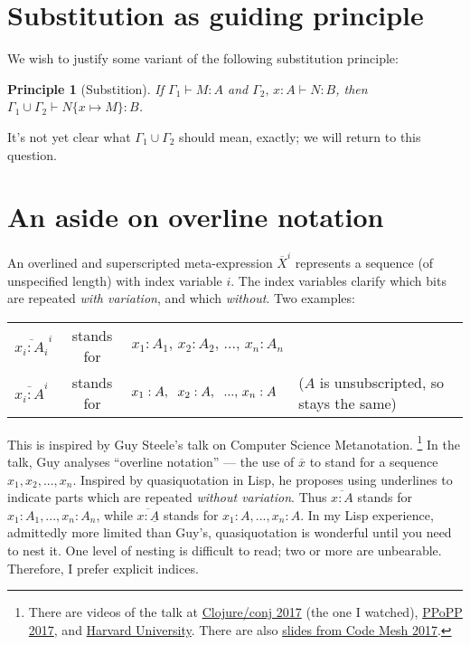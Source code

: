 \documentclass{article}
\newtheorem{principle}{Principle}
\newcommand{\todo}[1]{{\color{red}#1}}
\newcommand{\GG}{\Gamma}
\newcommand{\sub}[1]{\{{#1}\}}
\newcommand{\h}[3]{#1 : {#2}}
\begin{document}

\section{Substitution as guiding principle}

We wish to justify some variant of the following substitution principle:

\begin{principle}[Substition]
  If $\GG_1 \vdash \h{M}{A}{s}$ and $\GG_2,\, \h{x}{A}{s} \vdash \h{N}{B}{t}$,
  then \(\GG_1 \cup \GG_2 \vdash \h{N\sub{x \mapsto M}}{B}{t}\).
\end{principle}

It's not yet clear what $\GG_1 \cup \GG_2$ should mean, exactly; \todo{we will
  return to this question.}


\section{An aside on overline notation}

\newcommand{\xbar}[2]{\overline{#2}^{#1}}

An overlined and superscripted meta-expression $\xbar{i}{X}$ represents a
sequence (of unspecified length) with index variable $i$. The index variables
clarify which bits are repeated \emph{with variation}, and which \emph{without}.
Two examples:

\begin{center}
  \begin{tabular}{lcll}
    $\xbar{i}{x_i : A_i}$ & stands for
    & $x_1 : A_1,\, x_2 : A_2,\, ...,\, x_n : A_n$
    \\
    $\xbar{i}{x_i : A}$ & stands for
    & $x_1 : A,\hspace{0.6em} x_2 : A,\hspace{0.6em} ...,\, x_n : A$
    & ($A$ is unsubscripted, so stays the same)
  \end{tabular}
\end{center}

This is inspired by Guy Steele's talk on Computer Science Metanotation.%
\footnote{There are videos of the talk at
  \href{https://www.youtube.com/watch?v=dCuZkaaou0Q}{Clojure/conj 2017} (the one
  I watched), \href{https://www.youtube.com/watch?v=7HKbjYqqPPQ}{PPoPP 2017},
  and
  \href{https://www.youtube.com/watch?v=8fCfkGFF7X8&feature=youtu.be&t=37m46s}{Harvard
    University}. There are also
  \href{http://s3.amazonaws.com/erlang-conferences-production/media/files/000/000/755/original/Guy_L._Steele_-_A_Cobbler's_Child.pdf?1510053539}{slides
    from Code Mesh 2017}.}
In the talk, Guy analyses ``overline notation'' --- the use of $\overline{x}$ to
stand for a sequence $x_1, x_2, ..., x_n$.
Inspired by quasiquotation in Lisp, he proposes using underlines to indicate
parts which are repeated \emph{without variation}. Thus $\overline{x : A}$
stands for $x_1 : A_1, ..., x_n : A_n$, while $\overline{x : \underline{A}}$
stands for $x_1 : A, ..., x_n : A$.
In my Lisp experience, admittedly more limited than Guy's, quasiquotation is
wonderful until you need to nest it. One level of nesting is difficult to read;
two or more are unbearable. Therefore, I prefer explicit indices.
\end{document}
